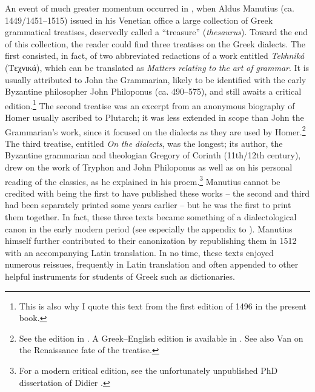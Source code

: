 An event of much greater momentum occurred in \citealt{August1496}, when Aldus Manutius (ca. 1449/1451–1515) issued in his Venetian office a large collection of Greek grammatical treatises, deservedly called a “treasure” (\textit{thesaurus}). Toward the end of this collection, the reader could find three treatises on the Greek dialects. The first consisted, in fact, of two abbreviated redactions of a work entitled \textit{Tekhniká} (Tεχνικά), which can be translated as \textit{Matters} \textit{relating} \textit{to} \textit{the} \textit{art} \textit{of} \textit{grammar}. It is usually attributed to John the Grammarian, likely to be identified with the early Byzantine philosopher John Philoponus (ca. 490–575), and still awaits a critical edition.\footnote{This is also why I quote this text from the first edition of 1496 in the present book.} The second treatise was an excerpt from an anonymous biography of Homer usually ascribed to Plutarch; it was less extended in scope than John the Grammarian’s work, since it focused on the dialects as they are used by Homer.\footnote{See the edition in \citet{Kindstrand1990}. A Greek–English edition is available in \citet{KeaneyLamberton1996}. See also Van \citet{Rooy2018c} on the Renaissance fate of the treatise.} The third treatise, entitled \textit{On} \textit{the} \textit{dialects}, was the longest; its author, the Byzantine grammarian and theologian Gregory of Corinth (11th/12th century), drew on the work of Tryphon and John Philoponus as well as on his personal reading of the classics, as he explained in his proem.\footnote{For a modern critical edition, see the unfortunately unpublished PhD dissertation of Didier \citet{Xhardez1991}.} Manutius cannot be credited with being the first to have published these works – the second and third had been separately printed some years earlier – but he was the first to print them together. In fact, these three texts became something of a dialectological canon in the early modern period (see especially the appendix to \citealt{Trovato1984}). Manutius himself further contributed to their canonization by republishing them in 1512 with an accompanying Latin translation. In no time, these texts enjoyed numerous reissues, frequently in Latin translation and often appended to other helpful instruments for students of Greek such as dictionaries.


